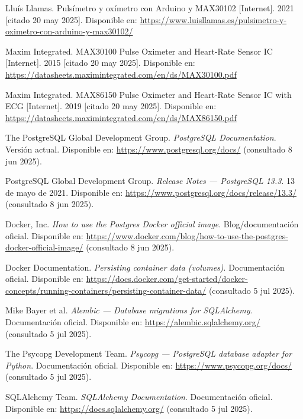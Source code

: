 \documentclass[12pt, a4paper]{article}
\begin{document}
\begin{thebibliography}{9}
	Lluís Llamas. Pulsímetro y oxímetro con Arduino y MAX30102 [Internet]. 2021 [citado 20 may 2025]. Disponible en: \url{https://www.luisllamas.es/pulsimetro-y-oximetro-con-arduino-y-max30102/}
	
	Maxim Integrated. MAX30100 Pulse Oximeter and Heart-Rate Sensor IC [Internet]. 2015 [citado 20 may 2025]. Disponible en: \url{https://datasheets.maximintegrated.com/en/ds/MAX30100.pdf}
	
	Maxim Integrated. MAX86150 Pulse Oximeter and Heart-Rate Sensor IC with ECG [Internet]. 2019 [citado 20 may 2025]. Disponible en: \url{https://datasheets.maximintegrated.com/en/ds/MAX86150.pdf}
	


	The PostgreSQL Global Development Group.
	\textit{PostgreSQL Documentation}. Versión actual.
	Disponible en: \url{https://www.postgresql.org/docs/} (consultado 8 jun 2025).
	
	PostgreSQL Global Development Group.
	\textit{Release Notes — PostgreSQL 13.3}. 13 de mayo de 2021.
	Disponible en: \url{https://www.postgresql.org/docs/release/13.3/} (consultado 8 jun 2025).
	
	Docker, Inc.
	\textit{How to use the Postgres Docker official image}. Blog/documentación oficial.
	Disponible en: \url{https://www.docker.com/blog/how-to-use-the-postgres-docker-official-image/} (consultado 8 jun 2025).
	
	Docker Documentation.
	\textit{Persisting container data (volumes)}.  Documentación oficial.
	Disponible en: \url{https://docs.docker.com/get-started/docker-concepts/running-containers/persisting-container-data/} (consultado 5 jul 2025).
	
	Mike Bayer et al.
	\textit{Alembic — Database migrations for SQLAlchemy}. Documentación oficial.
	Disponible en: \url{https://alembic.sqlalchemy.org/} (consultado 5 jul 2025).
	
	The Psycopg Development Team.
	\textit{Psycopg — PostgreSQL database adapter for Python}. Documentación oficial.
	Disponible en: \url{https://www.psycopg.org/docs/} (consultado 5 jul 2025).
	
	SQLAlchemy Team.
	\textit{SQLAlchemy Documentation}. Documentación oficial.
	Disponible en: \url{https://docs.sqlalchemy.org/} (consultado 5 jul 2025).
	

\end{thebibliography}
\end{document}
